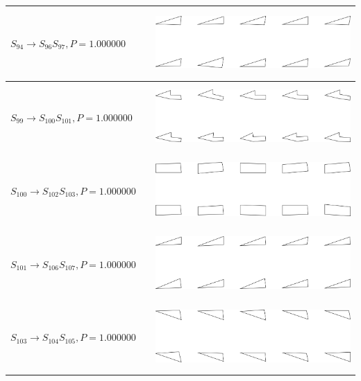 \begin{tabular}{|l|c|c|}

\hline
$S_{94} \to S_{96} S_{97}, P=1.000000$ &  & \includegraphics[height=1in]{output/1.models/hand_built/romerchoice/gram.0048.sample.png} \\
\hline
$S_{99} \to S_{100} S_{101}, P=1.000000$ &  & \includegraphics[height=1in]{output/1.models/hand_built/romerchoice/gram.0049.sample.png} \\
\hline
$S_{100} \to S_{102} S_{103}, P=1.000000$ &  & \includegraphics[height=1in]{output/1.models/hand_built/romerchoice/gram.0050.sample.png} \\
\hline
$S_{101} \to S_{106} S_{107}, P=1.000000$ &  & \includegraphics[height=1in]{output/1.models/hand_built/romerchoice/gram.0051.sample.png} \\
\hline
$S_{103} \to S_{104} S_{105}, P=1.000000$ &  & \includegraphics[height=1in]{output/1.models/hand_built/romerchoice/gram.0052.sample.png} \\
\hline
\end{tabular}
